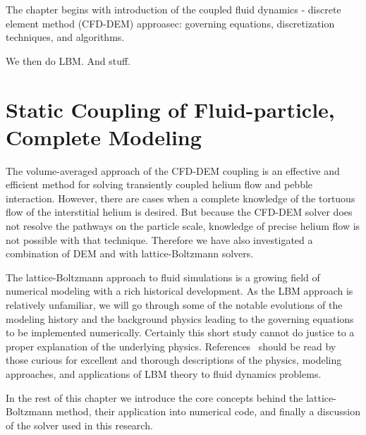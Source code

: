 The chapter begins with introduction of the coupled fluid dynamics - discrete element method (CFD-DEM) approasec: governing equations, discretization techniques, and algorithms.

We then do LBM. And stuff.








\section{Static Coupling of Fluid-particle, Complete Modeling}\label{sec:modeling-lbm}
The volume-averaged approach of the CFD-DEM coupling is an effective and efficient method for solving transiently coupled helium flow and pebble interaction. However, there are cases when a complete knowledge of the tortuous flow of the interstitial helium is desired. But because the CFD-DEM solver does not resolve the pathways on the particle scale, knowledge of precise helium flow is not possible with that technique. Therefore we have also investigated a combination of DEM and with lattice-Boltzmann solvers. 

The lattice-Boltzmann approach to fluid simulations is a growing field of numerical modeling with a rich historical development. As the LBM approach is relatively unfamiliar, we will go through some of the notable evolutions of the modeling history and the background physics leading to the governing equations to be implemented numerically. Certainly this short study cannot do justice to a proper explanation of the underlying physics. References~\cite{Chen1998a,Viggen2009,Sukop2007,Chopard2002,succi2001lattice} should be read by those curious for excellent and thorough descriptions of the physics, modeling approaches, and applications of LBM theory to fluid dynamics problems.

In the rest of this chapter we introduce the core concepts behind the lattice-Boltzmann method, their application into numerical code, and finally a discussion of the solver used in this research.




